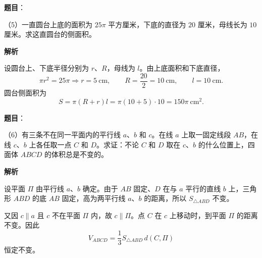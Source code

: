 \begin{answer}

\textbf{题目}：

（5）一直圆台上底的面积为 $25\pi$ 平方厘米，下底的直径为 $20$ 厘米，母线长为 $10$ 厘米。求这直圆台的侧面积。

\textbf{解析}

设圆台上、下底半径分别为 $r$、$R$，母线为 $l$。由上底面积和下底直径，
\nopagebreak[4]
\[
\pi r^2=25\pi\Rightarrow r=5\ \mathrm{cm},
\qquad R=\frac{20}{2}=10\ \mathrm{cm},
\qquad l=10\ \mathrm{cm}.
\]
圆台侧面积为
\nopagebreak[4]
\[
S=\pi(R+r)l=\pi(10+5)\cdot10=150\pi\ \mathrm{cm}^2.
\]


\end{answer}
\begin{answer}

\textbf{题目}：

（6）有三条不在同一平面内的平行线 $a$、$b$ 和 $c$。在线 $a$ 上取一固定线段 $AB$，在线 $c$、$b$ 上各任取一点 $C$ 和 $D$。求证：不论 $C$ 和 $D$ 取在 $c$、$b$ 的什么位置上，四面体 $ABCD$ 的体积总是不变的。
\nopagebreak[4]
\begin{center}\end{center}
\nopagebreak[4]
\textbf{解析}
\nopagebreak[4]
\begin{center}\end{center}
\nopagebreak[4]
设平面 $\Pi$ 由平行线 $a$、$b$ 确定。由于 $AB$ 固定、$D$ 在与 $a$ 平行的直线 $b$ 上，三角形 $ABD$ 的底 $AB$ 固定，高为两平行线 $a$、$b$ 的距离，所以 $S_{\triangle ABD}$ 不变。

又因 $c\parallel a$ 且 $c$ 不在平面 $\Pi$ 内，故 $c\parallel\Pi$。点 $C$ 在 $c$ 上移动时，到平面 $\Pi$ 的距离不变。因此
\nopagebreak[4]
\[
V_{ABCD}=\frac13S_{\triangle ABD}\,d(C,\Pi)
\]
恒定不变。


\end{answer}

